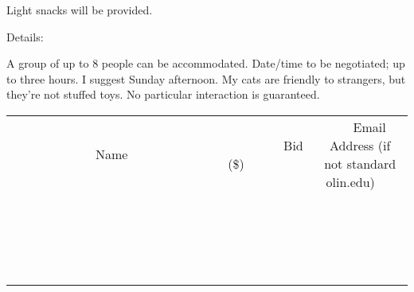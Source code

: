 \documentclass[11pt]{article}
\begin{document}
Light snacks will be provided.


Details:

A group of up to 8 people can be accommodated.
Date/time to be negotiated; up to three hours. I suggest Sunday afternoon.
My cats are friendly to strangers, but they're not stuffed toys. No particular interaction is guaranteed.
\\[3ex]
\begin{tabular}{c c c}
~~~~~~~~~~~~~Name~~~~~~~~~~~~~ & ~~~~~~~~~Bid (\$)~~~~~~~~~  & ~~~Email Address (if not standard olin.edu)~~~\\
 & & \\
\hline
 & & \\
\hline
 & & \\
\hline
 & & \\
\hline
 & & \\
\hline
 & & \\
\hline
 & & \\
\hline
 & & \\
\hline
 & & \\
\hline
 & & \\
\hline
 & & \\
\hline
 & & \\
\hline
 & & \\
\hline
 & & \\
\hline
 & & \\
\hline
 & & \\
\hline
 & & \\
\hline
 & & \\
\hline
 & & \\
\hline
\end{tabular}
\newpage
\end{document}
